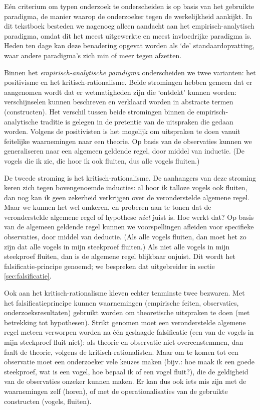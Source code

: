 \documentclass[
]{book}
\begin{document}
Eén criterium om typen onderzoek te onderscheiden is op basis van het
gebruikte paradigma, de manier waarop de onderzoeker tegen de
werkelijkheid aankijkt. In dit tekstboek besteden we nagenoeg alleen
aandacht aan het empirisch-analytisch paradigma, omdat dit het meest
uitgewerkte en meest invloedrijke paradigma is. Heden ten dage kan deze
benadering opgevat worden als `de' standaardopvatting, waar andere
paradigma's zich min of meer tegen afzetten.

Binnen het \emph{empirisch-analytische paradigma} onderscheiden we twee
varianten: het positivisme en het kritisch-rationalisme. Beide
stromingen hebben gemeen dat er aangenomen wordt dat er wetmatigheden
zijn die `ontdekt' kunnen worden: verschijnselen kunnen beschreven en
verklaard worden in abstracte termen (constructen). Het verschil tussen
beide stromingen binnen de empirisch-analytische traditie is gelegen in
de pretentie van de uitspraken die gedaan worden. Volgens de
positivisten is het mogelijk om uitspraken te doen vanuit feitelijke
waarnemingen naar een theorie. Op basis van de observaties kunnen we
generaliseren naar een algemeen geldende regel, door middel van
inductie. (De vogels die ik zie, die hoor ik ook fluiten, dus alle
vogels fluiten.)

De tweede stroming is het kritisch-rationalisme. De aanhangers van deze
stroming keren zich tegen bovengenoemde inducties: al hoor ik talloze
vogels ook fluiten, dan nog kan ik geen zekerheid verkrijgen over de
veronderstelde algemene regel. Maar we kunnen het wel omkeren, en
proberen aan te tonen dat de veronderstelde algemene regel of hypothese \emph{niet} juist is. Hoe werkt dat? Op basis van de algemeen geldende regel
kunnen we voorspellingen afleiden voor specifieke observaties, door
middel van deductie. (Als alle vogels fluiten, dan moet het zo zijn dat
alle vogels in mijn steekproef fluiten.) Als niet alle vogels in mijn
steekproef fluiten, dan is de algemene regel blijkbaar onjuist. Dit
wordt het falsificatie-principe genoemd; we bespreken dat uitgebreider
in sectie \ref{sec:falsificatie}.

Ook aan het kritisch-rationalisme kleven echter tenminste twee bezwaren.
Met het falsificatieprincipe kunnen waarnemingen (empirische feiten,
observaties, onderzoeksresultaten) gebruikt worden om theoretische
uitspraken te doen (met betrekking tot hypothesen). Strikt genomen moet
een veronderstelde algemene regel meteen verworpen worden na één
geslaagde falsificatie (een van de vogels in mijn steekproef fluit
niet): als theorie en observatie niet overeenstemmen, dan faalt de
theorie, volgens de kritisch-rationalisten. Maar om te komen tot een
observatie moet een onderzoeker vele keuzes maken (bijv.: hoe maak ik
een goede steekproef, wat is een vogel, hoe bepaal ik of een vogel
fluit?), die de geldigheid van de observaties onzeker kunnen maken. Er
kan dus ook iets mis zijn met de waarnemingen zelf (horen), of met de
operationalisaties van de gebruikte constructen (vogels, fluiten).
\end{document}
